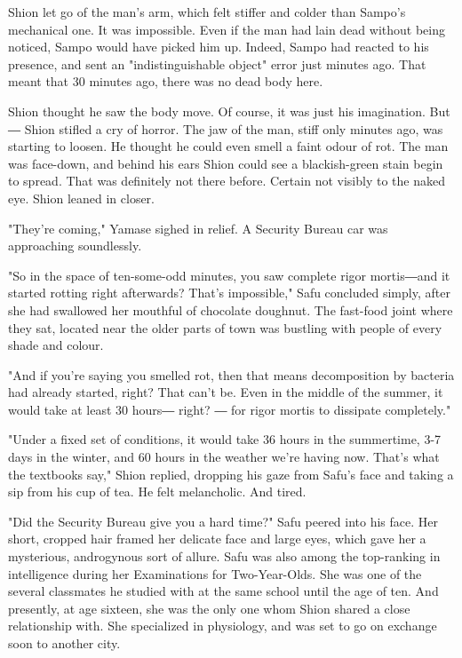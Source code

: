 Shion let go of the man's arm, which felt stiffer and colder than
Sampo's mechanical one. It was impossible. Even if the man had lain dead
without being noticed, Sampo would have picked him up. Indeed, Sampo had
reacted to his presence, and sent an "indistinguishable object" error
just minutes ago. That meant that 30 minutes ago, there was no dead body
here.

Shion thought he saw the body move. Of course, it was just his
imagination. But ― Shion stifled a cry of horror. The jaw of the man,
stiff only minutes ago, was starting to loosen. He thought he could even
smell a faint odour of rot. The man was face-down, and behind his ears
Shion could see a blackish-green stain begin to spread. That was
definitely not there before. Certain not visibly to the naked eye. Shion
leaned in closer.

"They're coming," Yamase sighed in relief. A Security Bureau car was
approaching soundlessly.

\myspace

"So in the space of ten-some-odd minutes, you saw complete rigor
mortis―and it started rotting right afterwards? That's impossible," Safu
concluded simply, after she had swallowed her mouthful of chocolate
doughnut. The fast-food joint where they sat, located near the older
parts of town was bustling with people of every shade and colour.

"And if you're saying you smelled rot, then that means decomposition by
bacteria had already started, right? That can't be. Even in the middle
of the summer, it would take at least 30 hours― right? ― for rigor
mortis to dissipate completely."

"Under a fixed set of conditions, it would take 36 hours in the
summertime, 3-7 days in the winter, and 60 hours in the weather we're
having now. That's what the textbooks say," Shion replied, dropping his
gaze from Safu's face and taking a sip from his cup of tea. He felt
melancholic. And tired.

"Did the Security Bureau give you a hard time?" Safu peered into his
face. Her short, cropped hair framed her delicate face and large eyes,
which gave her a mysterious, androgynous sort of allure. Safu was also
among the top-ranking in intelligence during her Examinations for
Two-Year-Olds. She was one of the several classmates he studied with at
the same school until the age of ten. And presently, at age sixteen, she
was the only one whom Shion shared a close relationship with. She
specialized in physiology, and was set to go on exchange soon to another
city.

